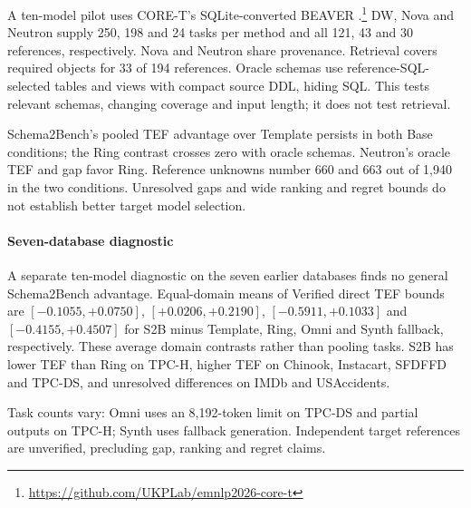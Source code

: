 A ten-model pilot uses CORE-T's SQLite-converted BEAVER \citep{chen2024beaver}.\footnote{\url{https://github.com/UKPLab/emnlp2026-core-t}} DW, Nova and Neutron supply 250, 198 and 24 tasks per method and all 121, 43 and 30 references, respectively. Nova and Neutron share provenance. Retrieval covers required objects for 33 of 194 references. Oracle schemas use reference-SQL-selected tables and views with compact source DDL, hiding SQL. This tests relevant schemas, changing coverage and input length; it does not test retrieval.

Schema2Bench's pooled TEF advantage over Template persists in both Base conditions; the Ring contrast crosses zero with oracle schemas. Neutron's oracle TEF and gap favor Ring. Reference unknowns number 660 and 663 out of 1,940 in the two conditions. Unresolved gaps and wide ranking and regret bounds do not establish better target model selection.

\paragraph{Seven-database diagnostic}
A separate ten-model diagnostic on the seven earlier databases finds no general Schema2Bench advantage. Equal-domain means of Verified direct TEF bounds are $[-0.1055,+0.0750]$, $[+0.0206,+0.2190]$, $[-0.5911,+0.1033]$ and $[-0.4155,+0.4507]$ for S2B minus Template, Ring, Omni and Synth fallback, respectively. These average domain contrasts rather than pooling tasks. S2B has lower TEF than Ring on TPC-H, higher TEF on Chinook, Instacart, SFDFFD and TPC-DS, and unresolved differences on IMDb and USAccidents.

Task counts vary: Omni uses an 8,192-token limit on TPC-DS and partial outputs on TPC-H; Synth uses fallback generation. Independent target references are unverified, precluding gap, ranking and regret claims.
